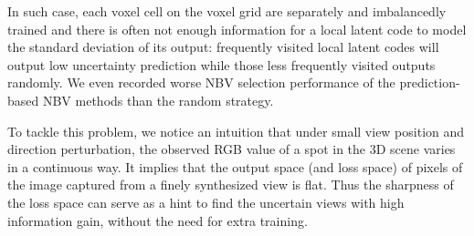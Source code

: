 In such case, each voxel cell on the voxel grid are separately and imbalancedly trained and there is often not enough information for a local latent code to model the standard deviation of its output: frequently visited local latent codes will output low uncertainty prediction while those less frequently visited outputs randomly.
We even recorded worse NBV selection performance of the prediction-based NBV methods than the random strategy.

To tackle this problem, we notice an intuition that under small view position and direction perturbation, the observed RGB value of a spot in the 3D scene varies in a continuous way.
It implies that the output space (and loss space) of pixels of the image captured from a finely synthesized view is flat.
Thus the sharpness of the loss space can serve as a hint to find the uncertain views with high information gain, without the need for extra training.




